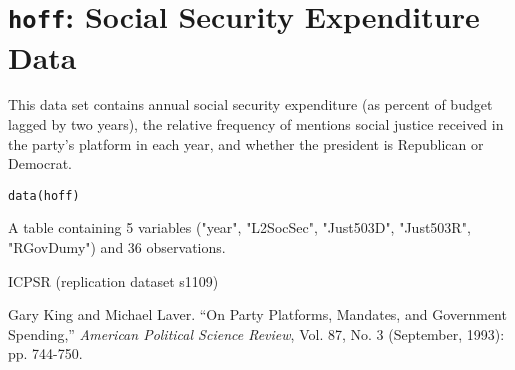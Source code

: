  \section{{\tt hoff}: Social Security Expenditure Data}\label{ss:hoff}
\begin{Description}\relax
This data set contains annual social security expenditure (as percent
of budget lagged by two years), the
relative frequency of mentions social justice received in the party's
platform in each year, and whether the president is Republican or
Democrat.
\end{Description}
\begin{Usage}
\begin{verbatim}data(hoff)\end{verbatim}
\end{Usage}
\begin{Format}\relax
A table containing 5 variables ("year", "L2SocSec", "Just503D", "Just503R", "RGovDumy") and 36 observations.
\end{Format}
\begin{Source}\relax
ICPSR (replication dataset s1109)
\end{Source}
\begin{References}\relax
Gary King and Michael Laver. ``On Party Platforms, Mandates, and
Government Spending,'' \emph{American Political Science Review},
Vol. 87, No. 3 (September, 1993): pp. 744-750.
\end{References}


